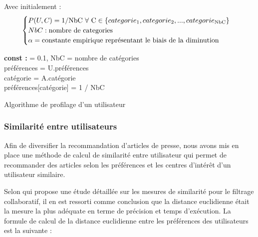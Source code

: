         Avec initialement :\\
        \[
        \begin{cases}
            P(U, C) = 1 / \text{NbC } \forall \text{ C} \in \{categorie\textsubscript{1}, categorie\textsubscript{2}, ..., categorie\textsubscript{NbC}\}\\
            NbC : \text{nombre de categories}\\
            \alpha = \text{constante empirique représentant le biais de la diminution}
        \end{cases}
        \]
        \begin{algorithm2e}[H]
        \SetAlgoLined
        \textbf{const :} \alpha = 0.1, NbC = nombre de catégories\\
        préférences = U.préférences\\
        catégorie = A.catégorie\\
        {
            préférences[catégorie] = 1 / NbC
        }
        \caption{Algorithme de profilage d'un utilisateur}
        \end{algorithm2e}
        \subsubsection{Similarité entre utilisateurs}
        Afin de diversifier la recommandation d'articles de presse, nous avons mis en place une méthode de calcul de similarité entre utilisateur qui permet de recommander des articles selon les préférences et les centres d'intérêt d'un utilisateur similaire. 

        Selon \cite{euclidepreuve} qui propose une étude détaillée sur les mesures de similarité pour le filtrage collaboratif, il en est ressorti comme conclusion que la distance euclidienne était la mesure la plus adéquate en terme de précision et temps d'exécution. La formule de calcul de la distance euclidienne entre les préférences des utilisateurs est la suivante :

